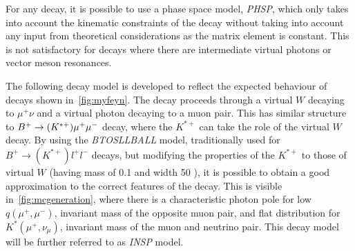 For any decay, it is possible to use a phase space model, \textit{PHSP}, which only takes into account the kinematic constraints of the decay without taking into account any input from theoretical considerations as the matrix element is constant. This is not satisfactory for decays where there are intermediate virtual photons or vector meson resonances.

The following decay model is developed to reflect the expected behaviour of decays shown in~\autoref{fig:myfeyn}. The decay proceeds through a virtual $W$ decaying to $\mu^{+} \nu$ and a virtual photon decaying to a muon pair. This has similar structure to ${B}^{+} \rightarrow (K^{*+}) \mu^{+} \mu^{-}$ decay, where the $K^{*+}$ can take the role of the virtual $W$ decay. By using the \textit{BTOSLLBALL} model\cite{Ali:1999mm}, traditionally used for $B^{+} \rightarrow (K^{*+}) l^{+} l^{-}$ decays, but modifying the properties of the $K^{*+}$ to those of virtual $W$ (having mass of 0.1 \gevcc and width 50 \gev), it is possible to obtain a good approximation to the correct features of the decay. This is visible in~\autoref{fig:mcgeneration}, where there is a characteristic photon pole for low $q(\mu^{+},\mu^{-})$, invariant mass of the opposite muon pair, and flat distribution for $K^{*}(\mu^{+}, \nu_{\mu}) $, invariant mass of the muon and neutrino pair. This decay model will be further referred to as \textit{INSP} model. 




